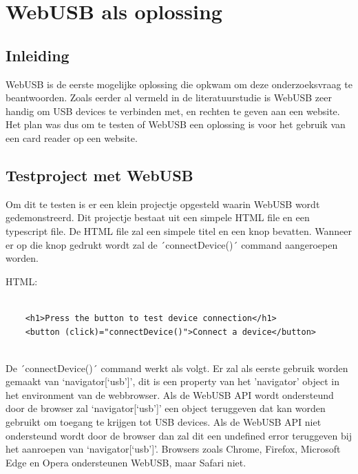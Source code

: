\section{WebUSB als oplossing}

\subsection{Inleiding}
WebUSB is de eerste mogelijke oplossing die opkwam om deze onderzoeksvraag te beantwoorden. Zoals eerder al vermeld in de literatuurstudie is WebUSB zeer handig om USB devices te verbinden met, en rechten te geven aan een website. Het plan was dus om te testen of WebUSB een oplossing is voor het gebruik van een card reader op een website.

\subsection{Testproject met WebUSB}
Om dit te testen is er een klein projectje opgesteld waarin WebUSB wordt gedemonstreerd. Dit projectje bestaat uit een simpele HTML file en een typescript file.  De HTML file zal een simpele titel en een knop bevatten. Wanneer er op die knop gedrukt wordt zal de ´connectDevice()´ command aangeroepen worden. 

HTML: 
\begin{verbatim} 
    
    <h1>Press the button to test device connection</h1> 
    <button (click)="connectDevice()">Connect a device</button> 
    
\end{verbatim} 

De ´connectDevice()´ command werkt als volgt. Er zal als eerste gebruik worden gemaakt van ‘navigator[‘usb’]’, dit is een property van het 'navigator’ object in het environment van de webbrowser. Als de WebUSB API wordt ondersteund door de browser zal ‘navigator[‘usb’]’ een object teruggeven dat kan worden gebruikt om toegang te krijgen tot USB devices. Als de WebUSB API niet ondersteund wordt door de browser dan zal dit een undefined error teruggeven bij het aanroepen van ‘navigator[‘usb’]’. Browsers zoals Chrome, Firefox, Microsoft Edge en Opera ondersteunen WebUSB, maar Safari niet. 

